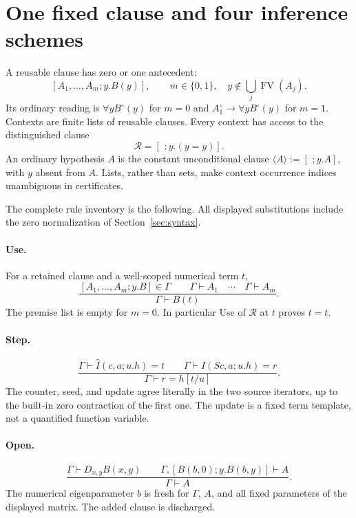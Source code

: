 \documentclass[11pt]{article}
\theoremstyle{definition}
\newcommand{\RR}{\mathcal R}
\newcommand{\cl}[1]{\langle #1\rangle}
\newcommand{\FV}{\operatorname{FV}}
\begin{document}
\section{One fixed clause and four inference schemes}
\label{sec:rules}

A reusable clause has zero or one antecedent:
\[
 [A_1,\ldots,A_m;y.B(y)],\qquad m\in\{0,1\},\quad
 y\notin\bigcup_j\FV(A_j).
\]
Its ordinary reading is $\forall y B^\circ(y)$ for $m=0$ and
$A_1^\circ\to\forall y B^\circ(y)$ for $m=1$. Contexts are finite lists
of reusable clauses. Every context has access to the distinguished clause
\begin{equation}
                 \RR=[\,\,;y.(y=y)].
                 \tag{R}\label{eq:R}
\end{equation}
An ordinary hypothesis $A$ is the constant unconditional clause
$\cl{A}:=[\,\,;y.A]$, with $y$ absent from $A$. Lists, rather than sets,
make context occurrence indices unambiguous in certificates.

The complete rule inventory is the following. All displayed substitutions
include the zero normalization of Section~\ref{sec:syntax}.

\paragraph{Use.}
For a retained clause and a well-scoped numerical term $t$,
\[
 \frac{[A_1,\ldots,A_m;y.B]\in\Gamma\qquad
       \Gamma\vdash A_1\quad\cdots\quad\Gamma\vdash A_m}
      {\Gamma\vdash B(t)}.
 \tag{Use}
\]
The premise list is empty for $m=0$. In particular Use of $\RR$ at $t$
proves $t=t$.

\paragraph{Step.}
\[
 \frac{\Gamma\vdash\widehat I(c,a;u.h)=t\qquad
       \Gamma\vdash I(Sc,a;u.h)=r}
      {\Gamma\vdash r=h[t/u]}.
 \tag{Step}\label{eq:Step}
\]
The counter, seed, and update agree literally in the two source iterators,
up to the built-in zero contraction of the first one. The update is a fixed
term template, not a quantified function variable.

\paragraph{Open.}
\[
 \frac{\Gamma\vdash D_{x,y}B(x,y)\qquad
       \Gamma,[B(b,0);y.B(b,y)]\vdash A}
      {\Gamma\vdash A}.
 \tag{Open}
\]
The numerical eigenparameter $b$ is fresh for $\Gamma$, $A$, and all
fixed parameters of the displayed matrix. The added clause is discharged.
\end{document}
